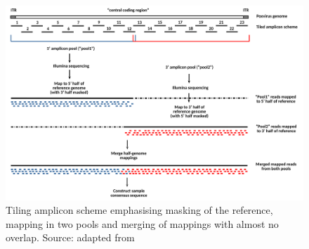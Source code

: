 \begin{figure}[ht!]
    \centering
    \hspace*{-8pt}
    \includegraphics[width=1.1\textwidth]{media/4-pox-ampl-fig.png}
    \caption[Tiling amplicon scheme used in poxvirus workflow.]{Tiling amplicon scheme emphasising masking of the reference, mapping in two pools and merging of mappings with almost no overlap. Source: adapted from }
    \label{fig:3-pox-ampl}
\end{figure}

